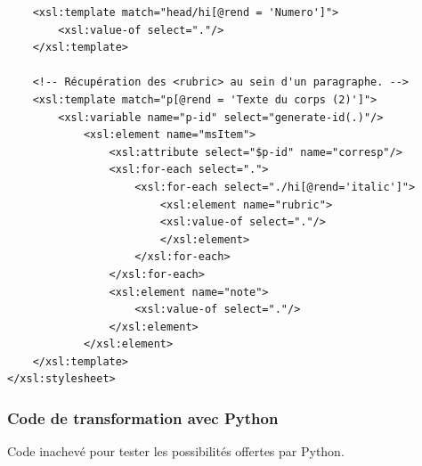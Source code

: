 \documentclass[a4paper,12pt,twoside]{book}
\begin{document}
\begin{verbatim}
    <xsl:template match="head/hi[@rend = 'Numero']">
        <xsl:value-of select="."/>
    </xsl:template>

    <!-- Récupération des <rubric> au sein d'un paragraphe. -->
    <xsl:template match="p[@rend = 'Texte du corps (2)']">
        <xsl:variable name="p-id" select="generate-id(.)"/>
            <xsl:element name="msItem">
                <xsl:attribute select="$p-id" name="corresp"/>
                <xsl:for-each select=".">
                    <xsl:for-each select="./hi[@rend='italic']">
                        <xsl:element name="rubric">
                        <xsl:value-of select="."/>
                        </xsl:element>
                    </xsl:for-each>
                </xsl:for-each>
                <xsl:element name="note">
                    <xsl:value-of select="."/>
                </xsl:element>
            </xsl:element>
    </xsl:template>
</xsl:stylesheet>
	\end{verbatim}
	
	\subsubsection{\label{code_python}Code de transformation avec Python}
	
	Code inachevé pour tester les possibilités offertes par Python.
	
\end{document}
